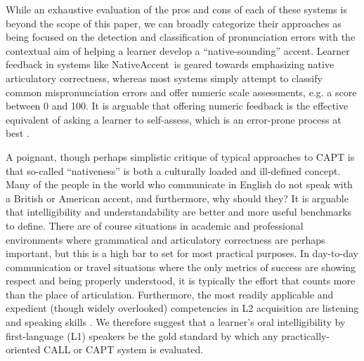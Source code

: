 While an exhaustive evaluation of the pros and cons of each of these systems is beyond the scope of this paper, we can broadly categorize their approaches as being focused on the detection and classification of pronunciation errors with the contextual aim of helping a learner develop a ``native-sounding'' accent. Learner feedback in systems like NativeAccent\textregistered \ is geared towards emphasizing native articulatory correctness, whereas most systems simply attempt to classify common mispronunciation errors and offer numeric scale assessments, e.g. a score between 0 and 100. It is arguable that offering numeric feedback is the effective equivalent of asking a learner to self-assess, which is an error-prone process at best \cite{eskenazi2007nativeaccenttm}.

A poignant, though perhaps simplistic critique of typical approaches to CAPT is that so-called ``nativeness'' is both a culturally loaded and ill-defined concept. Many of the people in the world who communicate in English do not speak with a British or American accent, and furthermore, why should they? It is arguable that intelligibility and understandability are better and more useful benchmarks to define. There are of course situations in academic and professional environments where grammatical and articulatory correctness are perhaps important, but this is a high bar to set for most practical purposes. In day-to-day communication or travel situations where the only metrics of success are showing respect and being properly understood, it is typically the effort that counts more than the place of articulation. Furthermore, the most readily applicable and expedient (though widely overlooked) competencies in L2 acquisition are listening and speaking skills \cite{brown1996performance} \cite{renukadevirole} \cite{feyten1991power} \cite{nunan2002listening} \cite{ferris1996academic}. We therefore suggest that a learner's oral intelligibility by first-language (L1) speakers be the gold standard by which any practically-oriented CALL or CAPT system is evaluated. 
